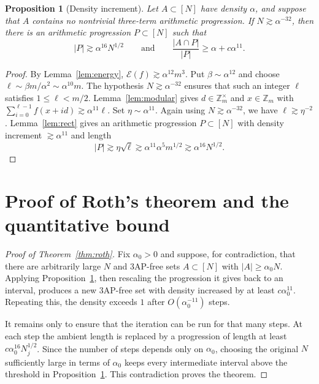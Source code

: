 \documentclass[11pt]{amsart}
\newcommand{\Z}{\mathbb{Z}}
\newcommand{\abs}[1]{\lvert#1\rvert}
\numberwithin{equation}{section}
\theoremstyle{plain}
\newtheorem{proposition}[theorem]{Proposition}
\theoremstyle{remark}
\begin{document}
\begin{proposition}[Density increment]\label{prop:increment}
Let $A\subset[N]$ have density $\alpha$, and suppose that $A$ contains no
nontrivial three-term arithmetic progression. If $N\gtrsim\alpha^{-32}$, then
there is an arithmetic progression $P\subset[N]$ such that
$$
\abs{P}\gtrsim\alpha^{16}N^{1/2}
\qquad\text{and}\qquad
\frac{\abs{A\cap P}}{\abs{P}}\geq\alpha+c\alpha^{11}.
$$
\end{proposition}

\begin{proof}
By Lemma~\ref{lem:energy}, $\mathcal E(f)\gtrsim\alpha^{12}m^3$. Put
$\beta\sim\alpha^{12}$ and choose
$\ell\sim\beta m/\alpha^2\sim\alpha^{10}m$. The hypothesis
$N\gtrsim\alpha^{-32}$ ensures that such an integer $\ell$ satisfies
$1\leq\ell<m/2$. Lemma~\ref{lem:modular} gives $d\in\Z_m^\times$ and
$x\in\Z_m$ with $\sum_{i=0}^{\ell-1}f(x+id)\gtrsim \alpha^{11}\ell$. Set
$\eta\sim\alpha^{11}$. Again using $N\gtrsim\alpha^{-32}$, we have
$\ell\gtrsim\eta^{-2}$. Lemma~\ref{lem:rect} gives an arithmetic progression
$P\subset[N]$ with density increment $\gtrsim\alpha^{11}$ and length
$$
\abs{P}\gtrsim \eta\sqrt{\ell}\gtrsim \alpha^{11}\alpha^5m^{1/2}
\gtrsim \alpha^{16}N^{1/2}.
$$
\end{proof}

\section{Proof of Roth's theorem and the quantitative bound}

\begin{proof}[Proof of Theorem~\ref{thm:roth}]
Fix $\alpha_0>0$ and suppose, for contradiction, that there are arbitrarily
large $N$ and 3AP-free sets $A\subset[N]$ with $\abs{A}\geq\alpha_0N$.
Applying Proposition~\ref{prop:increment}, then rescaling the progression it
gives back to an interval, produces a new 3AP-free set with density increased
by at least $c\alpha_0^{11}$. Repeating this, the density exceeds $1$ after
$O(\alpha_0^{-11})$ steps.

It remains only to ensure that the iteration can be run for that many steps.
At each step the ambient length is replaced by a progression of length at least
$c\alpha_0^{16}N_j^{1/2}$. Since the number of steps depends only on
$\alpha_0$, choosing the original $N$ sufficiently large in terms of $\alpha_0$
keeps every intermediate interval above the threshold in
Proposition~\ref{prop:increment}. This contradiction proves the theorem.
\end{proof}
\end{document}
